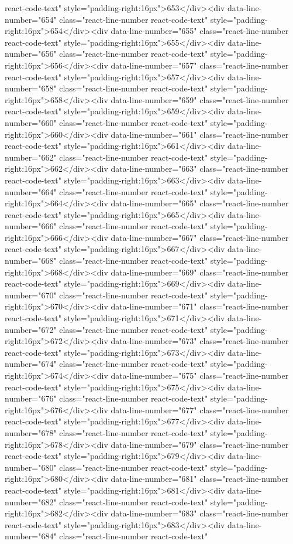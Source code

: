 react-code-text" style="padding-right:16px">653</div><div data-line-number="654" class="react-line-number react-code-text" style="padding-right:16px">654</div><div data-line-number="655" class="react-line-number react-code-text" style="padding-right:16px">655</div><div data-line-number="656" class="react-line-number react-code-text" style="padding-right:16px">656</div><div data-line-number="657" class="react-line-number react-code-text" style="padding-right:16px">657</div><div data-line-number="658" class="react-line-number react-code-text" style="padding-right:16px">658</div><div data-line-number="659" class="react-line-number react-code-text" style="padding-right:16px">659</div><div data-line-number="660" class="react-line-number react-code-text" style="padding-right:16px">660</div><div data-line-number="661" class="react-line-number react-code-text" style="padding-right:16px">661</div><div data-line-number="662" class="react-line-number react-code-text" style="padding-right:16px">662</div><div data-line-number="663" class="react-line-number react-code-text" style="padding-right:16px">663</div><div data-line-number="664" class="react-line-number react-code-text" style="padding-right:16px">664</div><div data-line-number="665" class="react-line-number react-code-text" style="padding-right:16px">665</div><div data-line-number="666" class="react-line-number react-code-text" style="padding-right:16px">666</div><div data-line-number="667" class="react-line-number react-code-text" style="padding-right:16px">667</div><div data-line-number="668" class="react-line-number react-code-text" style="padding-right:16px">668</div><div data-line-number="669" class="react-line-number react-code-text" style="padding-right:16px">669</div><div data-line-number="670" class="react-line-number react-code-text" style="padding-right:16px">670</div><div data-line-number="671" class="react-line-number react-code-text" style="padding-right:16px">671</div><div data-line-number="672" class="react-line-number react-code-text" style="padding-right:16px">672</div><div data-line-number="673" class="react-line-number react-code-text" style="padding-right:16px">673</div><div data-line-number="674" class="react-line-number react-code-text" style="padding-right:16px">674</div><div data-line-number="675" class="react-line-number react-code-text" style="padding-right:16px">675</div><div data-line-number="676" class="react-line-number react-code-text" style="padding-right:16px">676</div><div data-line-number="677" class="react-line-number react-code-text" style="padding-right:16px">677</div><div data-line-number="678" class="react-line-number react-code-text" style="padding-right:16px">678</div><div data-line-number="679" class="react-line-number react-code-text" style="padding-right:16px">679</div><div data-line-number="680" class="react-line-number react-code-text" style="padding-right:16px">680</div><div data-line-number="681" class="react-line-number react-code-text" style="padding-right:16px">681</div><div data-line-number="682" class="react-line-number react-code-text" style="padding-right:16px">682</div><div data-line-number="683" class="react-line-number react-code-text" style="padding-right:16px">683</div><div data-line-number="684" class="react-line-number react-code-text" 